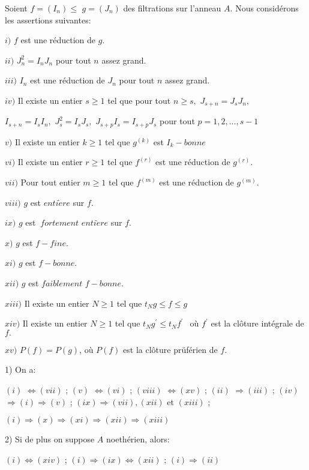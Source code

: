 \begin{montheoreme}
	Soient $f=(I_{n})\leq $ $g=(J_{n})$ des filtrations sur l'anneau $A.$ Nous
	considérons les assertions suivantes:
	
	$i)$ $f$ est une réduction de $g.$
	
	$ii)$ $J_{n}^{2}=I_{n}J_{n}$ pour tout $n$ assez grand.
	
	$iii)$ $I_{n}$ est une réduction de $J_{n}$ pour tout $n$ assez grand.
	
	$iv)$ Il existe un entier $s\geq 1$ tel que pour tout $n\geq s,$ $J_{s+n}=J_{s}J_{n},$
	
	$I_{s+n}=I_{s}I_{n},$ $J_{s}^{2}=I_{s}J_{s},$ $J_{s+p}I_{s}=I_{s+p}J_{s}$ pour tout $p=1,2,...,s-1$
	
	$v)$ Il existe un entier $k\geq 1$ tel que $g^{(k)}$ est $I_{k}-bonne$
	
	$vi)$ Il existe un entier $r\geq 1$ tel que $f^{(r)}$ est une réduction de $g^{(r)}.$
	
	$vii)$ Pour tout entier $m\geq 1$ tel que $f^{(m)}$ est une réduction de $g^{(m)}.$
	
	$viii)$ $g$ est $enti\grave{e}re$ sur $f.$
	
	$ix)$ $g$ est $\ fortement$ $enti\grave{e}re$ sur $f.$
	
	$x)$ $g$ est $f-fine.$
	
	$xi)$ $g$ est $f-bonne.$
	
	$xii)$ $g$ est $faiblement$ $f-bonne.$
	
	$xiii)$ Il existe un entier $N\geq 1$ tel que $t_{N}g\leq f\leq g$
	
	$xiv)$ Il existe un entier $N\geq 1$ tel que $t_{N}g^{\prime }\leq
	t_{N}f^{\prime \text{ }}$ o\`{u} $f^{\prime }$ est la clôture intégrale de $f.$
	
	$xv)$ $P(f)=P(g)$, o\`{u} $P(f)$ est la clôture prüférien de $f.$
	
	1) On a:
	
	$(i)$ $\Longleftrightarrow (vii)$ ; $(v)$ $\Longleftrightarrow (vi)$ ; $%
	(viii)$ $\Longleftrightarrow (xv)$ ; $(ii)$ $\Longrightarrow (iii)$ ; $(iv)$ 
	$\Longrightarrow (i)\Longrightarrow (v)$ ; $(ix)\Longrightarrow (vii),(xii)$
	et $(xiii)$ ;
	
	$(i)\Longrightarrow (x)\Longrightarrow (xi)\Longrightarrow
	(xii)\Longrightarrow (xiii)$
	
	2) Si de plus on suppose $A$ noethérien, alors:
	
	$(i)\Longleftrightarrow (xiv)$ ; $(i)\Longrightarrow (ix)\Longleftrightarrow
	(xii)$ ; $(i)\Longrightarrow (ii)$
	

\end{montheoreme}
